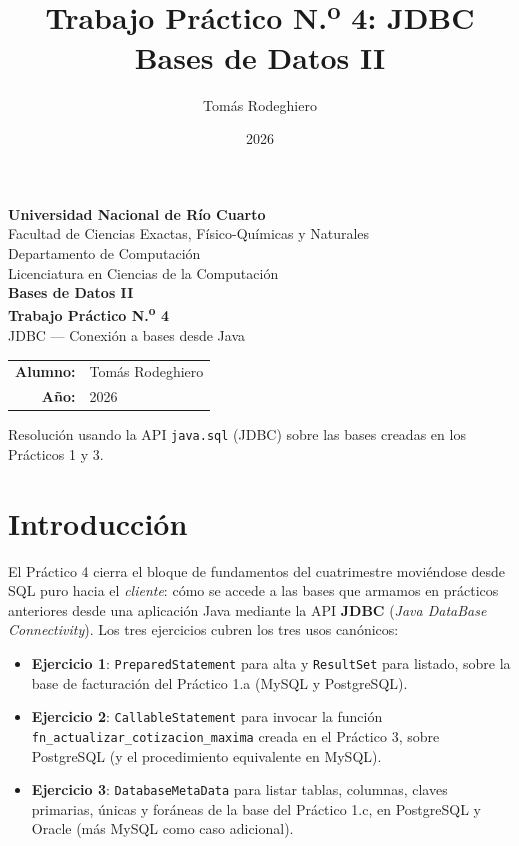 \documentclass[11pt,a4paper]{article}
\title{Trabajo Práctico N.\textsuperscript{o} 4: JDBC\\[4pt]
       \large Bases de Datos II}
\author{Tomás Rodeghiero}
\date{2026}
\begin{document}
\begin{titlepage}
    \centering
    \vspace*{1.5cm}

    {\large \textbf{Universidad Nacional de Río Cuarto}}\\[6pt]
    {\normalsize Facultad de Ciencias Exactas, Físico-Químicas y Naturales}\\[4pt]
    {\normalsize Departamento de Computación}\\[4pt]
    {\normalsize Licenciatura en Ciencias de la Computación}\\[3cm]

    {\Large \textbf{Bases de Datos II}}\\[1.2cm]

    {\Large \textbf{Trabajo Práctico N.\textsuperscript{o} 4}}\\[6pt]
    {\large JDBC --- Conexión a bases desde Java}\\[3cm]

    \begin{tabular}{rl}
        \textbf{Alumno:} & Tomás Rodeghiero \\[4pt]
        \textbf{Año:}    & 2026 \\
    \end{tabular}

    \vfill
    {\small Resolución usando la API \texttt{java.sql} (JDBC) sobre las
    bases creadas en los Prácticos 1 y 3.}
\end{titlepage}

\tableofcontents
\newpage

\section{Introducción}

El Práctico 4 cierra el bloque de fundamentos del cuatrimestre moviéndose desde SQL puro hacia el \emph{cliente}: cómo se accede a las bases que armamos en prácticos anteriores desde una aplicación Java mediante la API \textbf{JDBC} (\emph{Java DataBase Connectivity}). Los tres ejercicios cubren los tres usos canónicos:

\begin{itemize}
    \item \textbf{Ejercicio 1}: \texttt{PreparedStatement} para alta y \texttt{ResultSet} para listado, sobre la base de facturación del Práctico 1.a (MySQL y PostgreSQL).
    \item \textbf{Ejercicio 2}: \texttt{CallableStatement} para invocar la función \texttt{fn\_actualizar\_cotizacion\_maxima} creada en el Práctico 3, sobre PostgreSQL (y el procedimiento equivalente en MySQL).
    \item \textbf{Ejercicio 3}: \texttt{DatabaseMetaData} para listar tablas, columnas, claves primarias, únicas y foráneas de la base del Práctico 1.c, en PostgreSQL y Oracle (más MySQL como caso adicional).
\end{itemize}
\end{document}
